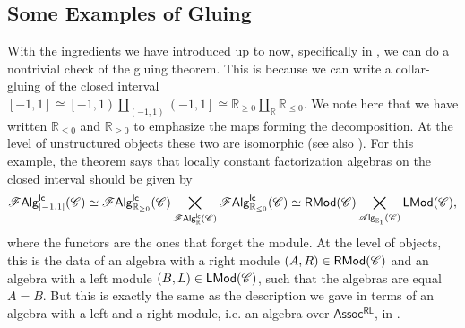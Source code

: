 \documentclass[../text]{subfiles}
\begin{document}
\subsection{Some Examples of Gluing}

\begin{example}\label{ex:reproduce_lcfas_on_interval}
    With the ingredients we have introduced up to now, specifically in , we can do a nontrivial check of the gluing theorem. This is because we can write a collar-gluing of the closed interval $[-1,1] \cong \left[-1,1\right) \coprod_{(-1,1)} \left(-1,1\right] \cong \mathbb{R}_{\geq 0} \coprod_{\mathbb{R}} \mathbb{R}_{\leq 0}$. We note here that we have written $\mathbb{R}_{\leq 0}$ and $\mathbb{R}_{\geq 0}$ to emphasize the maps forming the decomposition. At the level of unstructured objects these two are isomorphic (see also ). For this example, the theorem says that locally constant factorization algebras on the closed interval should be given by
    \begin{equation}
        \mathscr{F} \mathsf{Alg}^{\mathsf{lc}}_{[-1,1]} (\mathscr{C}) \simeq \mathscr{F} \mathsf{Alg}^{\mathsf{lc}}_{\mathbb{R}_{\geq 0}} (\mathscr{C}) \bigtimes_{\mathscr{F} \mathsf{Alg}^{\mathsf{lc}}_{\mathbb{R}} (\mathscr{C})} \mathscr{F} \mathsf{Alg}^{\mathsf{lc}}_{\mathbb{R}_{\leq 0}} (\mathscr{C}) \simeq \mathsf{RMod} (\mathscr{C}) \bigtimes_{\mathscr{A} \mathsf{lg}_{\mathbb{E}_1} (\mathscr{C})} \mathsf{LMod} (\mathscr{C}),
    \end{equation}
    where the functors are the ones that forget the module. At the level of objects, this is the data of an algebra with a right module $(A, R) \in \mathsf{RMod} (\mathscr{C})$ and an algebra with a left module $(B, L) \in \mathsf{LMod} (\mathscr{C})$, such that the algebras are equal $A = B$. But this is exactly the same as the description we gave in terms of an algebra with a left and a right module, i.e. an algebra over $\mathsf{Assoc^{RL}}$, in .
\end{example}
\end{document}
